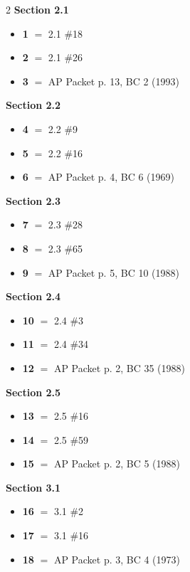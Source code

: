 \documentclass[11pt]{article}
\begin{document}
\begin{multicols}{2}
\noindent\textbf{Section 2.1}
\begin{itemize}[leftmargin=1.5em,itemsep=1pt,topsep=2pt]
\item[] \textbf{1} $=$ 2.1 \#18
\item[] \textbf{2} $=$ 2.1 \#26
\item[] \textbf{3} $=$ AP Packet p. 13, BC 2 (1993)
\end{itemize}
\smallskip
\noindent\textbf{Section 2.2}
\begin{itemize}[leftmargin=1.5em,itemsep=1pt,topsep=2pt]
\item[] \textbf{4} $=$ 2.2 \#9
\item[] \textbf{5} $=$ 2.2 \#16
\item[] \textbf{6} $=$ AP Packet p. 4, BC 6 (1969)
\end{itemize}
\smallskip
\noindent\textbf{Section 2.3}
\begin{itemize}[leftmargin=1.5em,itemsep=1pt,topsep=2pt]
\item[] \textbf{7} $=$ 2.3 \#28
\item[] \textbf{8} $=$ 2.3 \#65
\item[] \textbf{9} $=$ AP Packet p. 5, BC 10 (1988)
\end{itemize}
\smallskip
\noindent\textbf{Section 2.4}
\begin{itemize}[leftmargin=1.5em,itemsep=1pt,topsep=2pt]
\item[] \textbf{10} $=$ 2.4 \#3
\item[] \textbf{11} $=$ 2.4 \#34
\item[] \textbf{12} $=$ AP Packet p. 2, BC 35 (1988)
\end{itemize}
\smallskip
\noindent\textbf{Section 2.5}
\begin{itemize}[leftmargin=1.5em,itemsep=1pt,topsep=2pt]
\item[] \textbf{13} $=$ 2.5 \#16
\item[] \textbf{14} $=$ 2.5 \#59
\item[] \textbf{15} $=$ AP Packet p. 2, BC 5 (1988)
\end{itemize}
\smallskip
\noindent\textbf{Section 3.1}
\begin{itemize}[leftmargin=1.5em,itemsep=1pt,topsep=2pt]
\item[] \textbf{16} $=$ 3.1 \#2
\item[] \textbf{17} $=$ 3.1 \#16
\item[] \textbf{18} $=$ AP Packet p. 3, BC 4 (1973)
\end{itemize}

\end{multicols}
\end{document}
